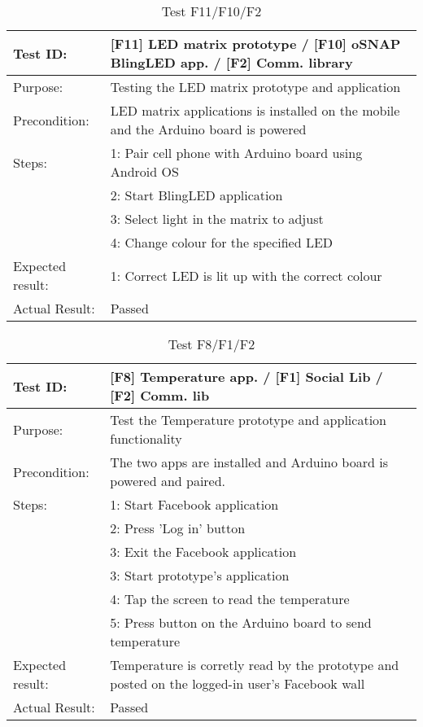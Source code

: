 \begin{table}[h!]
\begin{tabular}{|l|p{10cm}|}
\hline Test ID: &		[F11] LED matrix prototype / [F10] oSNAP BlingLED app. /
						[F2] Comm. library \\
\hline Purpose: &		Testing the LED matrix prototype and application \\
\hline Precondition: &	LED matrix applications is installed on the mobile and
						the Arduino board is powered \\
\hline
Steps:
 & 1: Pair cell phone with Arduino board using Android OS \\
 & 2: Start BlingLED application \\
 & 3: Select light in the matrix to adjust\\
 & 4: Change colour for the specified LED \\
\hline
Expected result:
 & 1: Correct LED is lit up with the correct colour\\
\hline
Actual Result: &  Passed \\
\hline
\end{tabular}
\caption{Test F11/F10/F2}
\label{tbl:f11f10f2test}
\end{table}


\begin{table}[h!]
\begin{tabular}{|l|p{10cm}|}
\hline Test ID: &		[F8] Temperature app. / [F1] Social Lib / [F2] Comm. lib \\
\hline Purpose: &		Test the Temperature prototype and application
						functionality  \\
\hline Precondition: &	The two apps are installed and Arduino board is powered
						and paired. \\
\hline
Steps:
  & 1: Start Facebook application \\
  & 2: Press 'Log in' button \\
  & 3: Exit the Facebook application \\
  & 3: Start prototype's application \\
  & 4: Tap the screen to read the temperature\\
  & 5: Press button on the Arduino board to send temperature \\
\hline
Expected result:
  & Temperature is corretly read by the prototype and posted on the logged-in
	user's Facebook wall \\
\hline
Actual Result:
  & Passed \\
\hline
\end{tabular}
\caption{Test F8/F1/F2}
\label{tbl:f8f1f2test}
\end{table}


